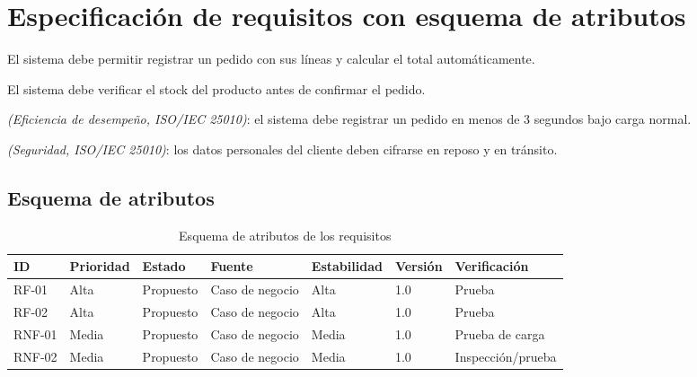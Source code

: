 \documentclass[11pt,a4paper]{article}
\begin{document}

\section{Especificación de requisitos con esquema de atributos}

\begin{description}[leftmargin=1.5cm]

\item[RF-01:]
El sistema debe permitir registrar un pedido con sus líneas y calcular el total
automáticamente.

\item[RF-02:]
El sistema debe verificar el stock del producto antes de confirmar el pedido.

\item[RNF-01:]
\textit{(Eficiencia de desempeño, ISO/IEC 25010)}:
el sistema debe registrar un pedido en menos de 3 segundos bajo carga normal.

\item[RNF-02:]
\textit{(Seguridad, ISO/IEC 25010)}:
los datos personales del cliente deben cifrarse en reposo y en tránsito.

\end{description}


\subsection*{Esquema de atributos}

\begin{table}[h!]
\centering

\begin{tabular}{lllllll}

\toprule

\textbf{ID}
&
\textbf{Prioridad}
&
\textbf{Estado}
&
\textbf{Fuente}
&
\textbf{Estabilidad}
&
\textbf{Versión}
&
\textbf{Verificación}
\\

\midrule

RF-01
&
Alta
&
Propuesto
&
Caso de negocio
&
Alta
&
1.0
&
Prueba
\\

RF-02
&
Alta
&
Propuesto
&
Caso de negocio
&
Alta
&
1.0
&
Prueba
\\

RNF-01
&
Media
&
Propuesto
&
Caso de negocio
&
Media
&
1.0
&
Prueba de carga
\\

RNF-02
&
Media
&
Propuesto
&
Caso de negocio
&
Media
&
1.0
&
Inspección/prueba
\\

\bottomrule

\end{tabular}

\caption{Esquema de atributos de los requisitos}

\end{table}
\end{document}
